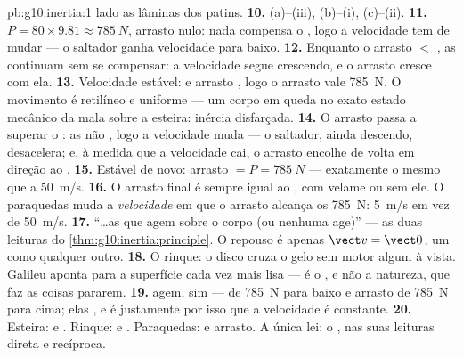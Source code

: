 \begin{solution}{pb:g10:inertia:1}
lado as lâminas dos patins.
\textbf{10.} (a)--(iii), (b)--(i), (c)--(ii).
\textbf{11.}  $P = 80 \times 9.81 \approx \qty{785}{N}$, arrasto
nulo: nada compensa o , logo a velocidade tem de mudar --- o saltador
ganha velocidade para baixo.
\textbf{12.} Enquanto o arrasto $<$ , as  continuam sem se
compensar: a velocidade segue crescendo, e o arrasto cresce com ela.
\textbf{13.} Velocidade estável:  e arrasto , logo o
arrasto vale \qty{785}{N}. O movimento é retilíneo e uniforme --- um
corpo em queda no exato estado mecânico da mala sobre a esteira: inércia
disfarçada.
\textbf{14.} O arrasto passa a superar o : as  não , logo a velocidade muda --- o saltador, ainda descendo,
desacelera; e, à medida que a velocidade cai, o arrasto encolhe de volta
em direção ao .
\textbf{15.} Estável de novo: arrasto $= P = \qty{785}{N}$ ---
exatamente o mesmo que a \qty{50}{m/s}.
\textbf{16.} O arrasto final é sempre igual ao , com velame ou sem
ele. O paraquedas muda a \emph{velocidade} em que o arrasto alcança os
\qty{785}{N}: \qty{5}{m/s} em vez de \qty{50}{m/s}.
\textbf{17.} ``\dots as  que agem sobre o corpo  (ou
nenhuma age)'' --- as duas leituras do
\cref{thm:g10:inertia:principle}. O repouso é apenas
$\vect v = \vect 0$, um  como qualquer
outro.
\textbf{18.} O rinque: o disco cruza o gelo sem motor algum à vista.
Galileu aponta para a superfície cada vez mais lisa --- é o , e não
a natureza, que faz as coisas pararem.
\textbf{19.}  agem, sim ---  de \qty{785}{N} para baixo e
arrasto de \qty{785}{N} para cima; elas \emph{}, e é
justamente por isso que a velocidade é constante.
\textbf{20.} Esteira:  e . Rinque:  e .
Paraquedas:  e arrasto. A única lei: o , nas suas
leituras direta e recíproca.
\end{solution}
